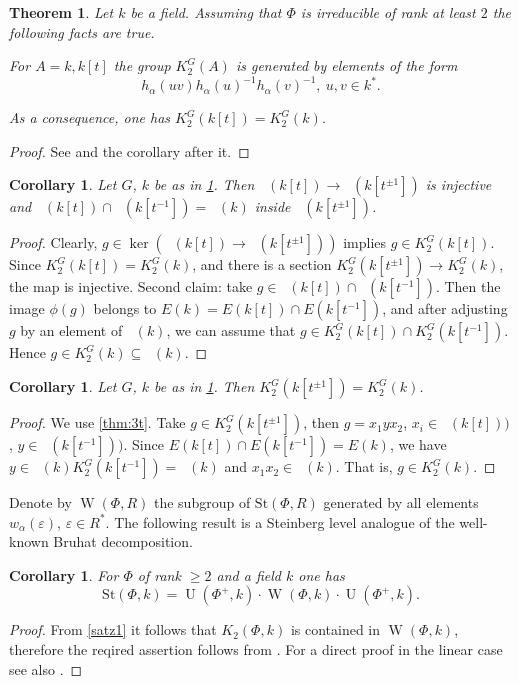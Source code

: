 \documentclass[oneside,12pt]{amsart}
\newtheorem{thm}{Theorem}
\numberwithin{equation}{section}
\numberwithin{lem}{section}
\newtheorem{cor}[lem]{Corollary}
\theoremstyle{definition}
\theoremstyle{remark}
\DeclareMathOperator{\UU}{U}
\DeclareMathOperator{\St}{St^G}
\DeclareMathOperator{\WW}{W}
\newcommand{\Stb}{\mathrm{St}}
\begin{document}
\begin{thm} \label{thm:k[t]}
Let $k$ be a field. Assuming that $\Phi$ is irreducible of rank at least $2$ the following facts are true.
\begin{thmlist}
 \item \label{satz1} For $A=k, k[t]$ the group $K_2^G(A)$ is generated by elements of the form 
  $$h_\alpha(uv) h_\alpha(u)^{-1} h_\alpha(v)^{-1},\ u,v\in k^*.$$
 \item As a consequence, one has $K_2^G(k[t]) = K_2^G(k)$.
\end{thmlist}
\end{thm}
\begin{proof}
 See \cite[Satz~1]{Re75} and the corollary after it.
\end{proof}

\begin{cor}\label{cor:k[t]inj}
Let $G$, $k$ be as in \cref{thm:k[t]}. 
Then $\St(k[t])\to\St(k[t^{\pm 1}])$ is injective and $\St(k[t])\cap\St(k[t^{-1}])=\St(k)$ inside $\St(k[t^{\pm 1}])$.
\end{cor}
\begin{proof}
Clearly, $g\in\ker(\St(k[t])\to\St(k[t^{\pm 1}]))$ implies $g\in K_2^G(k[t])$. Since $K_2^G(k[t])=K_2^G(k)$,
and  there is a section $K_2^G(k[t^{\pm 1}])\to K_2^G(k)$, the map is injective.
Second claim: take $g\in \St(k[t])\cap\St(k[t^{-1}])$.
Then the image $\phi(g)$ belongs to $E(k)=E(k[t])\cap E(k[t^{-1}])$, and
after adjusting $g$ by an element of $\St(k)$, we can assume that $g\in K_2^G(k[t])\cap K_2^G(k[t^{-1}])$. Hence
$g\in K_2^G(k)\subseteq\St(k)$.
\end{proof}

\begin{cor}
Let $G$, $k$ be as in \cref{thm:k[t]}. Then $K_2^G(k[t^{\pm 1}])=K_2^G(k)$.
\end{cor}
\begin{proof}
We use \cref{thm:3t}.
Take $g\in K_2^G(k[t^{\pm 1}])$,
then $g=x_1yx_2$, $x_i\in \St(k[t]))$, $y\in \St(k[t^{-1}]))$.
Since $E(k[t])\cap E(k[t^{-1}])=E(k)$,
we have $y\in\St(k)K_2^G(k[t^{-1}])=\St(k)$ and $x_1x_2\in\St(k)$. That is, $g\in K_2^G(k)$.
\end{proof}

Denote by $\WW(\Phi, R)$ the subgroup of $\Stb(\Phi, R)$ generated by all elements $w_\alpha(\varepsilon)$, $\varepsilon\in R^*$.
The following result is a Steinberg level analogue of the well-known Bruhat decomposition.
\begin{cor} \label{cor:bruhat}
 For $\Phi$ of rank $\geq 2$ and a field $k$ one has $$\Stb(\Phi, k) = \UU(\Phi^+, k) \cdot \WW(\Phi, k) \cdot \UU(\Phi^+, k).$$
\end{cor}
\begin{proof}
 From \cref{satz1} it follows that $K_2(\Phi, k)$ is contained in $\WW(\Phi, k)$, therefore the reqired assertion follows from \cite[Theorem~4]{St-lect}.
 For a direct proof in the linear case see also \cite[\S~2.3A]{HOM}.
\end{proof}
\end{document}
